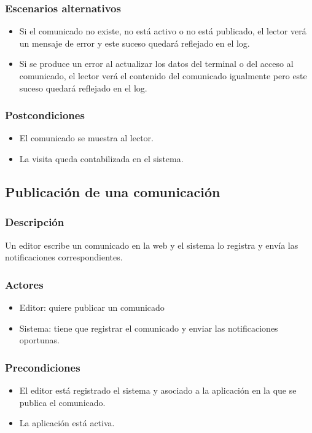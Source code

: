 \subsubsection*{Escenarios alternativos}
\begin{itemize}
    \item Si el comunicado no existe, no está activo o no está publicado, el lector verá un mensaje de error y este suceso quedará reflejado en el log.
    \item Si se produce un error al actualizar los datos del terminal o del acceso al comunicado, el lector verá el contenido del comunicado igualmente pero este suceso quedará reflejado en el log.
\end{itemize}

\subsubsection*{Postcondiciones}
\begin{itemize}
    \item El comunicado se muestra al lector.
    \item La visita queda contabilizada en el sistema.
\end{itemize}


\subsection{Publicación de una comunicación}

\subsubsection*{Descripción}
Un editor escribe un comunicado en la web y el sistema lo registra y envía las notificaciones correspondientes.

\subsubsection*{Actores}
\begin{itemize}
    \item Editor: quiere publicar un comunicado
    \item Sistema: tiene que registrar el comunicado y enviar las notificaciones oportunas.
\end{itemize}

\subsubsection*{Precondiciones}
\begin{itemize}
    \item El editor está registrado el sistema y asociado a la aplicación en la que se publica el comunicado.
    \item La aplicación está activa.
\end{itemize}

